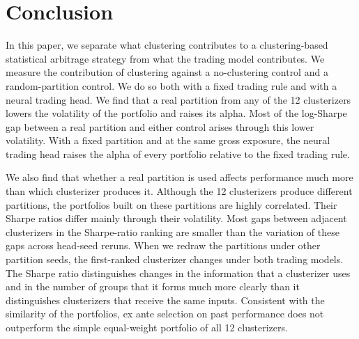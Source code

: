 \section{Conclusion}
\label{sec:conclusion}

In this paper, we separate what clustering contributes to a clustering-based statistical arbitrage strategy from what the trading model contributes. We measure the contribution of clustering against a no-clustering control and a random-partition control. We do so both with a fixed trading rule and with a neural trading head. We find that a real partition from any of the 12 clusterizers lowers the volatility of the portfolio and raises its alpha. Most of the log-Sharpe gap between a real partition and either control arises through this lower volatility. With a fixed partition and at the same gross exposure, the neural trading head raises the alpha of every portfolio relative to the fixed trading rule.

We also find that whether a real partition is used affects performance much more than which clusterizer produces it. Although the 12 clusterizers produce different partitions, the portfolios built on these partitions are highly correlated. Their Sharpe ratios differ mainly through their volatility. Most gaps between adjacent clusterizers in the Sharpe-ratio ranking are smaller than the variation of these gaps across head-seed reruns. When we redraw the partitions under other partition seeds, the first-ranked clusterizer changes under both trading models. The Sharpe ratio distinguishes changes in the information that a clusterizer uses and in the number of groups that it forms much more clearly than it distinguishes clusterizers that receive the same inputs. Consistent with the similarity of the portfolios, ex ante selection on past performance does not outperform the simple equal-weight portfolio of all 12 clusterizers.

